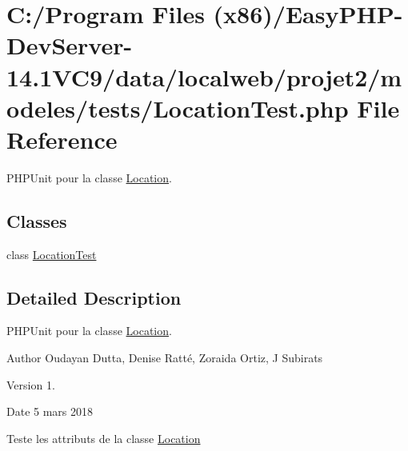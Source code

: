 \hypertarget{_location_test_8php}{}\section{C\+:/\+Program Files (x86)/\+Easy\+P\+H\+P-\/\+Dev\+Server-\/14.1\+V\+C9/data/localweb/projet2/modeles/tests/\+Location\+Test.php File Reference}
\label{_location_test_8php}


P\+H\+P\+Unit pour la classe \hyperlink{class_location}{Location}.  


\subsection*{Classes}
\begin{DoxyCompactItemize}
\item 
class \hyperlink{class_location_test}{Location\+Test}
\end{DoxyCompactItemize}


\subsection{Detailed Description}
P\+H\+P\+Unit pour la classe \hyperlink{class_location}{Location}. 

\begin{DoxyAuthor}{Author}
Oudayan Dutta, Denise Ratté, Zoraida Ortiz, J Subirats 
\end{DoxyAuthor}
\begin{DoxyVersion}{Version}
1. 
\end{DoxyVersion}
\begin{DoxyDate}{Date}
5 mars 2018
\end{DoxyDate}
Teste les attributs de la classe \hyperlink{class_location}{Location} 